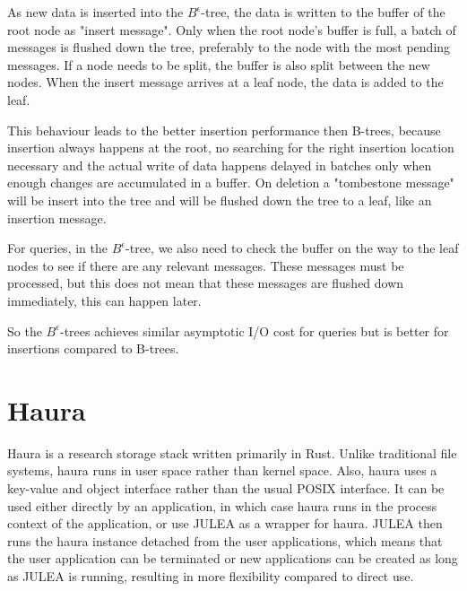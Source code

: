 \documentclass[
	12pt,
	a4paper,
	abstract,
	bibliography=totoc,
	chapterprefix,
	headings=openright,
	numbers=endperiod,
	parskip=half,
	twoside,
]{scrreprt}
\begin{document}
As new data is inserted into the $B^{\epsilon}$-tree, the data is written to the buffer of the root node as "insert message".
Only when the root node's buffer is full, a batch of messages is flushed down the tree, preferably to the node with the most pending messages. 
If a node needs to be split, the buffer is also split between the new nodes.
When the insert message arrives at a leaf node, the data is added to the leaf.

This behaviour leads to the better insertion performance then B-trees, because insertion always happens at the root, no searching for the right insertion location necessary and 
the actual write of data happens delayed in batches only when enough changes are accumulated in a buffer.
On deletion a "tombestone message" will be insert into the tree and will be flushed down the tree to a leaf, like an insertion message.

For queries, in the $B^{\epsilon}$-tree, we also need to check the buffer on the way to the leaf nodes to see if there are any relevant messages.
These messages must be processed, but this does not mean that these messages are flushed down immediately, this can happen later.

So the $B^{\epsilon}$-trees achieves similar asymptotic I/O cost for queries but is better for insertions compared to B-trees.

\section{Haura}


Haura is a research storage stack written primarily in Rust.
Unlike traditional file systems, haura runs in user space rather than kernel space.
Also, haura uses a key-value and object interface rather than the usual POSIX interface.
It can be used either directly by an application, in which case haura runs in the process context of the application, or
use JULEA as a wrapper for haura.
JULEA then runs the haura instance detached from the user applications, which means that the user application can be terminated or new applications can be created as long as JULEA is running, resulting in more flexibility compared to direct use.
\end{document}

